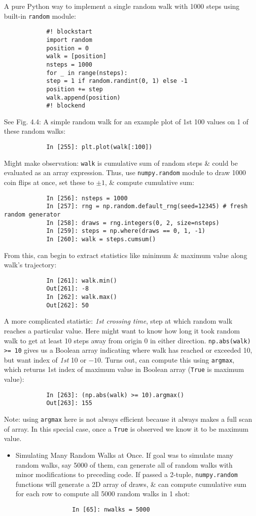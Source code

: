\documentclass{article}
\begin{document}
\begin{itemize}
\begin{itemize}
		A pure Python way to implement a single random walk with 1000 steps using built-in {\tt random} module:
		\begin{verbatim}
			#! blockstart
			import random
			position = 0
			walk = [position]
			nsteps = 1000
			for _ in range(nsteps):
			step = 1 if random.randint(0, 1) else -1
			position += step
			walk.append(position)
			#! blockend
		\end{verbatim}
		See {\sf Fig. 4.4: A simple random walk} for an example plot of 1st 100 values on 1 of these random walks:
		\begin{verbatim}
			In [255]: plt.plot(walk[:100])
		\end{verbatim}
		Might make observation: {\tt walk} is cumulative sum of random steps \& could be evaluated as an array expression. Thus, use {\tt numpy.random} module to draw 1000 coin flips at once, set these to $\pm1$, \& compute cumulative sum:
		\begin{verbatim}
			In [256]: nsteps = 1000
			In [257]: rng = np.random.default_rng(seed=12345) # fresh random generator
			In [258]: draws = rng.integers(0, 2, size=nsteps)
			In [259]: steps = np.where(draws == 0, 1, -1)
			In [260]: walk = steps.cumsum()
		\end{verbatim}
		From this, can begin to extract statistics like minimum \& maximum value along walk's trajectory:
		\begin{verbatim}
			In [261]: walk.min()
			Out[261]: -8
			In [262]: walk.max()
			Out[262]: 50
		\end{verbatim}
		A more complicated statistic: {\it1st crossing time}, step at which random walk reaches a particular value. Here might want to know how long it took random walk to get at least 10 steps away from origin 0 in either direction. {\tt np.abs(walk) >= 10} gives us a Boolean array indicating where walk has reached or exceeded 10, but want index of {\it1st} 10 or $-10$. Turns out, can compute this using {\tt argmax}, which returns 1st index of maximum value in Boolean array ({\tt True} is maximum value):
		\begin{verbatim}
			In [263]: (np.abs(walk) >= 10).argmax()
			Out[263]: 155
		\end{verbatim}
		Note: using {\tt argmax} here is not always efficient because it always makes a full scan of array. In this special case, once a {\tt True} is observed we know it to be maximum value. 
		\begin{itemize}
			\item {\sf Simulating Many Random Walks at Once.} If goal was to simulate many random walks, say 5000 of them, can generate all of random walks with minor modifications to preceding code. If passed a 2-tuple, {\tt numpy.random} functions will generate a 2D array of draws, \& can compute cumulative sum for each row to compute all 5000 random walks in 1 shot:
			\begin{verbatim}
				In [65]: nwalks = 5000
				

\end{verbatim}
\end{itemize}
\end{itemize}
\end{itemize}
\end{document}
